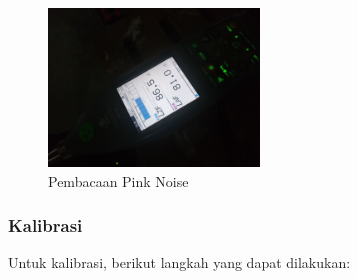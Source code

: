 \documentclass{article}
\begin{document}
\begin{itemize}
		\begin{figure}[H]
			\centering
			\includegraphics[width=0.5\textwidth,angle=0]{images/ears_slm_pinknoise}
			\caption{Pembacaan Pink Noise}
		\end{figure}
		
	\end{itemize}

	\subsubsection{Kalibrasi}
	
	Untuk kalibrasi, berikut langkah yang dapat dilakukan:
	
\end{document}
